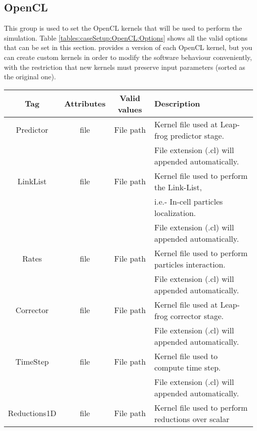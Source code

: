 \subsection{OpenCL}
\label{sss:XML:OpenCL}
%
This group is used to set the OpenCL kernels that will be used to perform the
simulation. Table \ref{tables:caseSetup:OpenCL:Options} shows all the valid
options that can be set in this section.\rc
%
\NAME provides a version of each OpenCL kernel, but you can create custom
kernels in order to modify the software behaviour conveniently, with the
restriction that new kernels must preserve input parameters (sorted as the
original one).
%
\begin{table}[h!b!p!]\small
	\centering
	\begin{tabular}{| c | c | c | l | }
		\hline
		\cellcolor[rgb]{0.7,0.7,0.7}Tag & \cellcolor[rgb]{0.7,0.7,0.7}Attributes & \cellcolor[rgb]{0.7,0.7,0.7}Valid values & \cellcolor[rgb]{0.7,0.7,0.7}Description \\
		\hline
		Predictor & file & File path & Kernel file used at Leap-frog predictor stage. \\
		          &      &           & File extension (.cl) will appended automatically. \\
		\hline
		LinkList          & file & File path & Kernel file used to perform the Link-List, \\
		                  &      &           & i.e.- In-cell particles localization. \\
		                  &      &           & File extension (.cl) will appended automatically. \\
		\hline
		Rates             & file & File path & Kernel file used to perform particles interaction. \\
		                  &      &           & File extension (.cl) will appended automatically. \\
		\hline
		Corrector         & file & File path & Kernel file used at Leap-frog corrector stage. \\
		                  &      &           & File extension (.cl) will appended automatically. \\
		\hline
		TimeStep          & file & File path & Kernel file used to compute time step. \\
		                  &      &           & File extension (.cl) will appended automatically. \\
		\hline
		Reductions1D      & file & File path & Kernel file used to perform reductions over scalar \\

\end{tabular}
\end{table}
